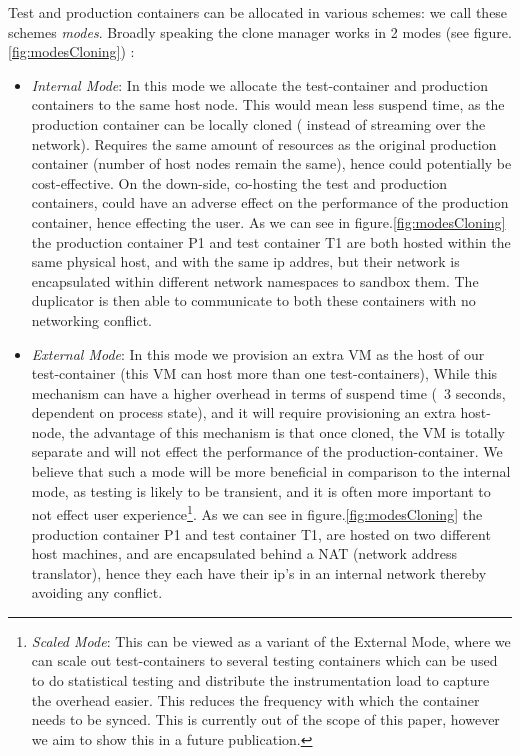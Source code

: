 Test and production containers can be allocated in various schemes: we call these schemes \textit{modes}. 
Broadly speaking the clone manager works in 2 modes (see figure.\ref{fig:modesCloning}) : 
\begin{itemize}

\item \textit{Internal Mode}: In this mode we allocate the test-container and  production containers to the same host node. 
This would mean less suspend time, as the production container can be locally cloned ( instead of streaming over the network). 
Requires the same amount of resources as the original production container (number of host nodes remain the same), hence could potentially be cost-effective.
On the down-side, co-hosting the test and production containers, could have an adverse effect on the performance of the production container, hence effecting the user.
As we can see in figure.\ref{fig:modesCloning} the production container P1 and test container T1 are both hosted within the same physical host, and with the same ip addres, but their network is encapsulated within different network namespaces to sandbox them.
The duplicator is then able to communicate to both these containers with no networking conflict.

\item \textit{External Mode}: In this mode we provision an extra VM as the host of our test-container (this VM can host more than one test-containers), 
While this mechanism can have a higher overhead in terms of suspend time (~3 seconds, dependent on process state), and it will require provisioning an extra host-node, the advantage of this mechanism is that once cloned, the VM is totally separate and will not effect the performance of the production-container.
We believe that such a mode will be more beneficial in comparison to the internal mode, as testing is likely to be transient, and it is often more important to not effect user experience\footnote{ \textit{Scaled Mode}: This can be viewed as a variant of the External Mode, where we can scale out test-containers to several testing containers which can be used to do statistical testing and distribute the instrumentation load to capture the overhead easier. This reduces the frequency with which the container needs to be synced. This is currently out of the scope of this paper, however we aim to show this in a future publication.}.
As we can see in figure.\ref{fig:modesCloning} the production container P1 and test container T1, are hosted on two different host machines, and are encapsulated behind a NAT\cite{nat} (network address translator), hence they each have their ip's in an internal network thereby avoiding any conflict.

\end{itemize}

